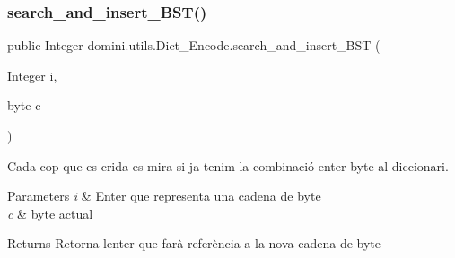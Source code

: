 \subsubsection{\texorpdfstring{search\+\_\+and\+\_\+insert\+\_\+\+B\+S\+T()}{search\_and\_insert\_BST()}}
{\footnotesize\ttfamily public Integer domini.\+utils.\+Dict\+\_\+\+Encode.\+search\+\_\+and\+\_\+insert\+\_\+\+B\+ST (\begin{DoxyParamCaption}\item[{Integer}]{i,  }\item[{byte}]{c }\end{DoxyParamCaption})\hspace{0.3cm}{\ttfamily [inline]}}



Cada cop que es crida es mira si ja tenim la combinació enter-\/byte al diccionari. 


\begin{DoxyParams}{Parameters}
{\em i} & Enter que representa una cadena de byte \\
\hline
{\em c} & byte actual \\
\hline
\end{DoxyParams}
\begin{DoxyReturn}{Returns}
Retorna l\textquotesingle{}enter que farà referència a la nova cadena de byte 
\end{DoxyReturn}

